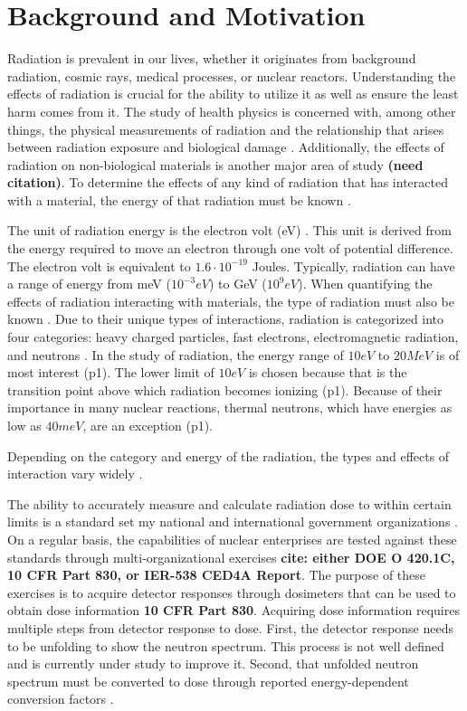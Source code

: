 \section{Background and Motivation}\label{background}
Radiation is prevalent in our lives, whether it originates from background radiation, cosmic rays, medical processes, or nuclear reactors. Understanding the effects of radiation is crucial for the ability to utilize it as well as ensure the least harm comes from it. The study of health physics is concerned with, among other things, the physical measurements of radiation and the relationship that arises between radiation exposure and biological damage \cite{cember2017}. Additionally, the effects of radiation on non-biological materials is another major area of study \textbf{(need citation)}. To determine the effects of any kind of radiation that has interacted with a material, the energy of that radiation must be known \cite{cember2017}. 

The unit of radiation energy is the electron volt (eV) \cite{cember2017}. This unit is derived from the energy required to move an electron through one volt of potential difference. The electron volt is equivalent to $1.6 \cdot 10^{-19}$ Joules. Typically, radiation can have a range of energy from meV ($10^{-3} eV$) to GeV ($10^9 eV$). When quantifying the effects of radiation interacting with materials, the type of radiation must also be known \cite{knoll_2020}. Due to their unique types of interactions, radiation is categorized into four categories: heavy charged particles, fast electrons, electromagnetic radiation, and neutrons \cite{knoll_2020}. In the study of radiation, the energy range of $10 eV$ to $20 MeV$ is of most interest \cite{knoll_2020} (p1). The lower limit of $10 eV$ is chosen because that is the transition point above which radiation becomes ionizing \cite{knoll_2020} (p1). Because of their importance in many nuclear reactions, thermal neutrons, which have energies as low as $40 meV$, are an exception \cite{knoll_2020} (p1).

Depending on the category and energy of the radiation, the types and effects of interaction vary widely \cite{evans}.

The ability to accurately measure and calculate radiation dose to within certain limits is a standard set my national and international government organizations \cite{doe-std-1098}. On a regular basis, the capabilities of nuclear enterprises are tested against these standards through multi-organizational exercises \textbf{cite: either DOE O 420.1C, 10 CFR Part 830, or IER-538 CED4A Report}. The purpose of these exercises is to acquire detector responses through dosimeters that can be used to obtain dose information \textbf{10 CFR Part 830}. Acquiring dose information requires multiple steps from detector response to dose. First, the detector response needs to be unfolding to show the neutron spectrum. This process is not well defined and is currently under study to improve it. Second, that unfolded neutron spectrum must be converted to dose through reported energy-dependent conversion factors \cite{compendium_of_neutron_spectra}.


